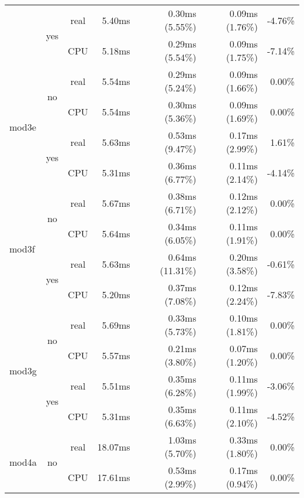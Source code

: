 \documentclass[en]{pracamgr}
\begin{document}
\begin{small}
\begin{longtable}{|l|c|c|r|r|r|r|}
                          \cline{2-7}
                          & \multirow{2}{*}{yes} & real & 5.40ms & 0.30ms (5.55\%) & 0.09ms (1.76\%) & -4.76\% \\*
                          &                      & CPU  & 5.18ms & 0.29ms (5.54\%) & 0.09ms (1.75\%) & -7.14\% \\
\hline
\multirow{4}{*}{mod3e}    & \multirow{2}{*}{no}  & real & 5.54ms & 0.29ms (5.24\%) & 0.09ms (1.66\%) & 0.00\% \\*
                          &                      & CPU  & 5.54ms & 0.30ms (5.36\%) & 0.09ms (1.69\%) & 0.00\% \\*
                          \cline{2-7}
                          & \multirow{2}{*}{yes} & real & 5.63ms & 0.53ms (9.47\%) & 0.17ms (2.99\%) & 1.61\% \\*
                          &                      & CPU  & 5.31ms & 0.36ms (6.77\%) & 0.11ms (2.14\%) & -4.14\% \\
\hline
\multirow{4}{*}{mod3f}    & \multirow{2}{*}{no}  & real & 5.67ms & 0.38ms (6.71\%) & 0.12ms (2.12\%) & 0.00\% \\*
                          &                      & CPU  & 5.64ms & 0.34ms (6.05\%) & 0.11ms (1.91\%) & 0.00\% \\*
                          \cline{2-7}
                          & \multirow{2}{*}{yes} & real & 5.63ms & 0.64ms (11.31\%) & 0.20ms (3.58\%) & -0.61\% \\*
                          &                      & CPU  & 5.20ms & 0.37ms (7.08\%) & 0.12ms (2.24\%) & -7.83\% \\
\hline
\multirow{4}{*}{mod3g}    & \multirow{2}{*}{no}  & real & 5.69ms & 0.33ms (5.73\%) & 0.10ms (1.81\%) & 0.00\% \\*
                          &                      & CPU  & 5.57ms & 0.21ms (3.80\%) & 0.07ms (1.20\%) & 0.00\% \\*
                          \cline{2-7}
                          & \multirow{2}{*}{yes} & real & 5.51ms & 0.35ms (6.28\%) & 0.11ms (1.99\%) & -3.06\% \\*
                          &                      & CPU  & 5.31ms & 0.35ms (6.63\%) & 0.11ms (2.10\%) & -4.52\% \\
\hline
\multirow{4}{*}{mod4a}    & \multirow{2}{*}{no}  & real & 18.07ms & 1.03ms (5.70\%) & 0.33ms (1.80\%) & 0.00\% \\*
                          &                      & CPU  & 17.61ms & 0.53ms (2.99\%) & 0.17ms (0.94\%) & 0.00\% \\*

\end{longtable}
\end{small}
\end{document}
